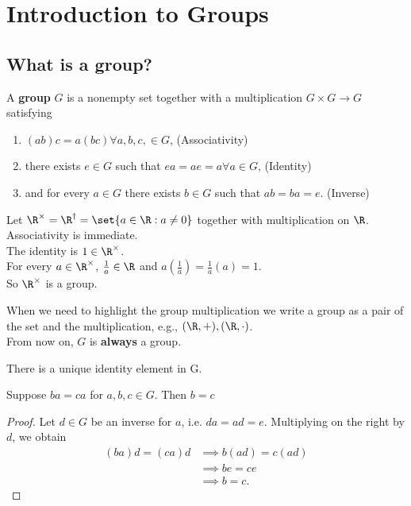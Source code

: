 \chapter{Introduction to Groups}


\section{What is a group?}

\begin{definition}[a group]
    A \textbf{group} $G$ is a nonempty set together with a multiplication $G \times G \to G$ satisfying
    \begin{enumerate}
        \item $(ab)c = a(bc) \forall a, b, c, \in G$, (Associativity)
        \item there exists $e \in G$ such that $ea = ae = a \forall a \in G$, (Identity)
        \item and for every $a \in G$ there exists $b \in G$ such that $ab = ba = e$. (Inverse)
    \end{enumerate}
\end{definition}

\begin{example}[a group]
    Let $\R^\times = \R^\dag = \set{a \in \R: a \neq 0}$ together with multiplication on $\R$. \\
    Associativity is immediate. \\
    The identity is $1 \in \R^\times$. \\
    For every $a \in \R^\times$, $\frac{1}{a} \in \R$ and $a(\frac{1}{a}) = \frac{1}{a}(a) = 1$. \\
    So $\R^\times$ is a group.
\end{example}

\begin{remark}
    When we need to highlight the group multiplication we write a group as a pair of the set and the multiplication, e.g., $(\R, +), (\R, \cdot)$. \\
    From now on, $G$ is \textbf{always} a group.
\end{remark}

\begin{theorem}
    There is a unique identity element in G.
\end{theorem}

\begin{theorem}[Cancellation] \label{thm:Cancellation}
    Suppose $ba = ca$ for $a,b,c \in G$. Then $b = c$ 
\end{theorem}
\begin{proof}
    Let $d \in G$ be an inverse for $a$, i.e. $da = ad = e$.
    Multiplying on the right by $d$, we obtain
    \begin{align*}
        (ba)d = (ca)d &\implies b(ad) = c(ad) \\
        &\implies be = ce \\
        &\implies b = c.
    \end{align*}
\end{proof}   

